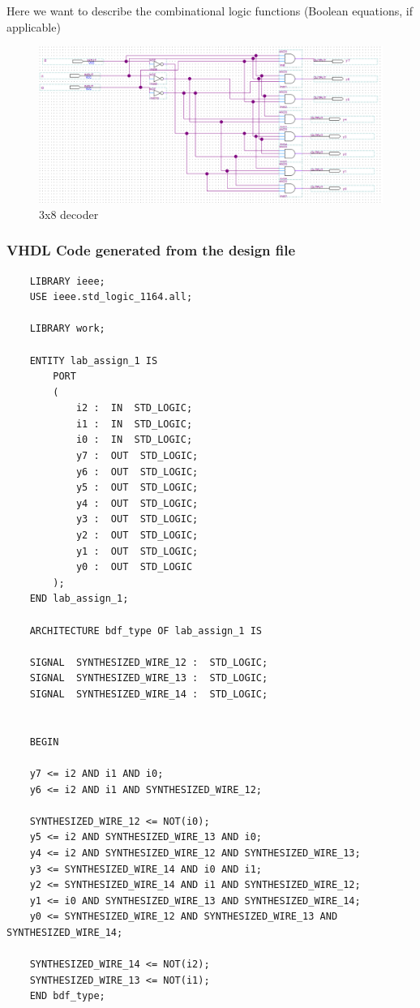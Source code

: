 \documentclass[12pt]{article}
\begin{document}
Here we want to describe the combinational logic functions (Boolean equations, if applicable)

\begin{figure}[h]
\caption{3x8 decoder}
\includegraphics[width=\textwidth]{./diagrams/3x8_decoder.png}
\end{figure}
\subsubsection{VHDL Code generated from the design file}
\begin{verbatim}
    LIBRARY ieee;
    USE ieee.std_logic_1164.all;

    LIBRARY work;

    ENTITY lab_assign_1 IS
    	PORT
    	(
    		i2 :  IN  STD_LOGIC;
    		i1 :  IN  STD_LOGIC;
    		i0 :  IN  STD_LOGIC;
    		y7 :  OUT  STD_LOGIC;
    		y6 :  OUT  STD_LOGIC;
    		y5 :  OUT  STD_LOGIC;
    		y4 :  OUT  STD_LOGIC;
    		y3 :  OUT  STD_LOGIC;
    		y2 :  OUT  STD_LOGIC;
    		y1 :  OUT  STD_LOGIC;
    		y0 :  OUT  STD_LOGIC
    	);
    END lab_assign_1;

    ARCHITECTURE bdf_type OF lab_assign_1 IS

    SIGNAL	SYNTHESIZED_WIRE_12 :  STD_LOGIC;
    SIGNAL	SYNTHESIZED_WIRE_13 :  STD_LOGIC;
    SIGNAL	SYNTHESIZED_WIRE_14 :  STD_LOGIC;


    BEGIN

    y7 <= i2 AND i1 AND i0;
    y6 <= i2 AND i1 AND SYNTHESIZED_WIRE_12;

    SYNTHESIZED_WIRE_12 <= NOT(i0);
    y5 <= i2 AND SYNTHESIZED_WIRE_13 AND i0;
    y4 <= i2 AND SYNTHESIZED_WIRE_12 AND SYNTHESIZED_WIRE_13;
    y3 <= SYNTHESIZED_WIRE_14 AND i0 AND i1;
    y2 <= SYNTHESIZED_WIRE_14 AND i1 AND SYNTHESIZED_WIRE_12;
    y1 <= i0 AND SYNTHESIZED_WIRE_13 AND SYNTHESIZED_WIRE_14;
    y0 <= SYNTHESIZED_WIRE_12 AND SYNTHESIZED_WIRE_13 AND SYNTHESIZED_WIRE_14;

    SYNTHESIZED_WIRE_14 <= NOT(i2);
    SYNTHESIZED_WIRE_13 <= NOT(i1);
    END bdf_type;

\end{verbatim}
\end{document}

